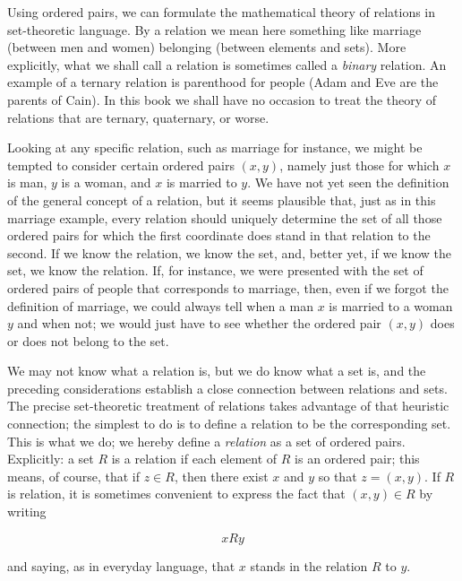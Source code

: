 
Using ordered pairs, we can formulate the mathematical theory of relations in set-theoretic language. By a relation we mean here something like marriage (between men and women) belonging (between elements and sets).  More explicitly, what we shall call a relation is sometimes called a \textit{binary} relation. An example of a ternary relation is parenthood for people (Adam and Eve are the parents of Cain). In this book we shall have no occasion to treat the theory of relations that are ternary, quaternary, or worse. 

Looking at any specific relation, such as marriage for instance, we might be tempted to consider certain ordered pairs $(x,y)$, namely just those for which $x$ is man, $y$ is a woman, and $x$ is married to $y$. We have not yet seen the definition of the general concept of a relation, but it seems plausible that, just as in this marriage example, every relation should uniquely determine the set of all those ordered pairs for which the first coordinate does stand in that relation to the second. If we know the relation, we know the set, and, better yet, if we know the set, we know the relation. If, for instance, we were presented with the set of ordered pairs of people that corresponds to marriage, then, even if we forgot the definition of marriage, we could always tell when a man $x$ is married to a woman $y$ and when not; we would just have to see whether the ordered pair $(x,y)$ does or does not belong to the set.

We may not know what a relation is, but we do know what a set is, and the preceding considerations establish a close connection between relations and sets. The precise set-theoretic treatment of relations takes advantage of that heuristic connection; the simplest to do is to define a relation to be the corresponding set. This is what we do; we hereby define a \textit{relation} as a set of ordered pairs. Explicitly: a set $R$ is a relation if each element of $R $ is an ordered pair; this means, of course, that if $z \in R $, then there exist $x$ and $y$ so that $z = (x,y)$. If $R $ is relation, it is sometimes convenient to express the fact that $(x, y) \in R $ by writing 

\begin{equation*}
x R y
\end{equation*}

and saying, as in everyday language, that $x$ stands in the relation $R $ to $y$. 

